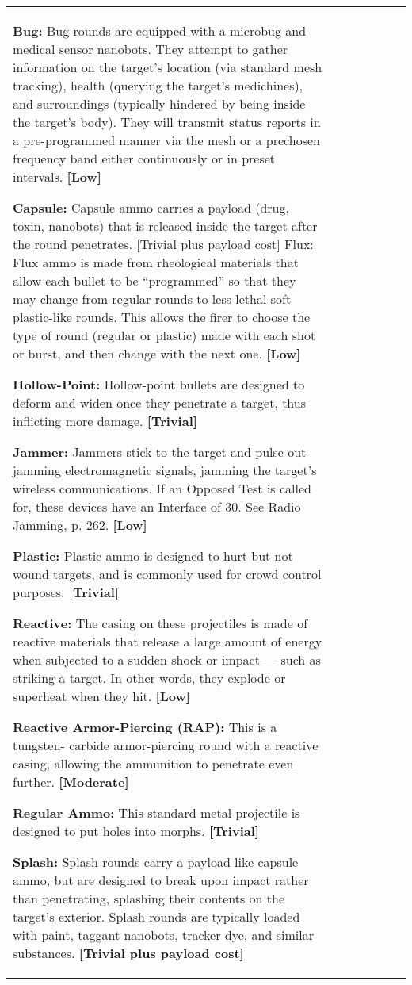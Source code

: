 \begin{tabular}{|l|l|l|l|l|l|l|}
\textbf{Bug:} Bug rounds are equipped with a microbug and medical sensor nanobots. They attempt to gather information on the target’s location (via standard mesh tracking), health (querying the target’s medichines), and surroundings (typically hindered by being inside the target’s body). They will transmit status reports in a pre-programmed manner via the mesh or a prechosen frequency band either continuously or in preset intervals. \textbf{[Low]} 

\textbf{Capsule:} Capsule ammo carries a payload (drug, toxin, nanobots) that is released inside the target after the round penetrates. [Trivial plus payload cost] Flux: Flux ammo is made from rheological materials that allow each bullet to be ``programmed'' so that they may change from regular rounds to less-lethal soft plastic-like rounds. This allows the firer to choose the type of round (regular or plastic) made with each shot or burst, and then change with the next one. \textbf{[Low]} 

\textbf{Hollow-Point:} Hollow-point bullets are designed to deform and widen once they penetrate a target, thus inflicting more damage. \textbf{[Trivial]} 

\textbf{Jammer:} Jammers stick to the target and pulse out jamming electromagnetic signals, jamming the target’s wireless communications. If an Opposed Test is called for, these devices have an Interface of 30. See Radio Jamming, p. 262. \textbf{[Low]} 

\textbf{Plastic:} Plastic ammo is designed to hurt but not wound targets, and is commonly used for crowd control purposes. \textbf{[Trivial]} 

\textbf{Reactive:} The casing on these projectiles is made of reactive materials that release a large amount of energy when subjected to a sudden shock or impact --- such as striking a target. In other words, they explode or superheat when they hit. \textbf{[Low]} 

\textbf{Reactive Armor-Piercing (RAP):} This is a tungsten- carbide armor-piercing round with a reactive casing, allowing the ammunition to penetrate even further. \textbf{[Moderate]} 

\textbf{Regular Ammo:} This standard metal projectile is designed to put holes into morphs. \textbf{[Trivial]} 

\textbf{Splash:} Splash rounds carry a payload like capsule ammo, but are designed to break upon impact rather than penetrating, splashing their contents on the target’s exterior. Splash rounds are typically loaded with paint, taggant nanobots, tracker dye, and similar substances. \textbf{[Trivial plus payload cost]} 


\end{tabular}
